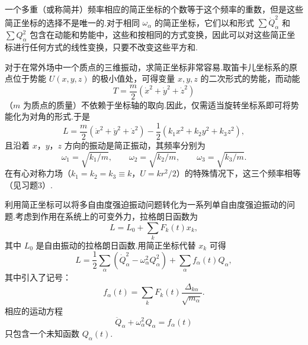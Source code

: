 一个多重（或称简并）频率相应的简正坐标的个数等于这个频率的重数，但是这些简正坐标的选择不是唯一的.对于相同 $\omega_\alpha$ 的简正坐标，它们以和形式 $\sum\dot{Q}_\alpha^2$ 和 $\sum Q_\alpha^2$ 包含在动能和势能中，这些和按相同的方式变换，因此可以对这些简正坐标进行任何方式的线性变换，只要不改变这些平方和.

对于在常外场中一个质点的三维振动，求简正坐标非常容易.取笛卡儿坐标系的原点位于势能 $U(x,y,z)$ 的极小值处，可得变量 $x,y,z$ 的二次形式的势能，而动能
\begin{equation*}
  T=\frac{m}{2}\left(\dot{x}^2+\dot{y}^2+\dot{z}^2\right)
\end{equation*}
（$m$ 为质点的质量）不依赖于坐标轴的取向.因此，仅需适当旋转坐标系即可将势能化为对角的形式.于是
\begin{equation}
  L=\frac{m}{2}\left(\dot{x}^2+\dot{y}^2+\dot{z}^2\right)
  -\frac{1}{2}\left(k_1x^2+k_2y^2+k_3z^2\right),
\end{equation}
且沿着 $x$，$y$，$z$ 方向的振动是简正振动，其频率分别为
\begin{equation*}
  \omega_1=\sqrt{k_1/m},\qquad
  \omega_2=\sqrt{k_2/m},\qquad
  \omega_3=\sqrt{k_3/m}.
\end{equation*}
在有心对称力场（$k_1=k_2=k_3\equiv k$，$U=kr^2/2$）的特殊情况下，这三个频率相等（见习题3）.

利用简正坐标可以将多自由度强迫振动问题转化为一系列单自由度强迫振动的问题.考虑到作用在系统上的可变外力，拉格朗日函数为
\begin{equation}
  L=L_0+\sum_kF_k(t)x_k,
\end{equation}
其中 $L_0$ 是自由振动的拉格朗日函数.用简正坐标代替 $x_k$ 可得
\begin{equation}
  L=\frac{1}{2}\sum_\alpha\left(\dot{Q}_\alpha^2-\omega_\alpha^2Q_\alpha^2\right)
  +\sum_\alpha f_\alpha(t)Q_\alpha,
\end{equation}
其中引入了记号：
\begin{equation*}
  f_\alpha(t)=\sum_kF_k(t)\frac{\Delta_{k\alpha}}{\sqrt{m_\alpha}}.
\end{equation*}
相应的运动方程
\begin{equation}
  \ddot{Q}_\alpha+\omega_\alpha^2Q_\alpha=f_\alpha(t)
\end{equation}
只包含一个未知函数 $Q_\alpha(t)$.

